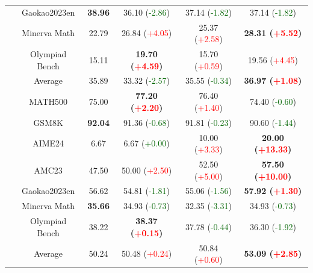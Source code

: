 \begin{table}[t]
\begin{subtable}{\linewidth}
\begin{tabular}{c||c|cccc}
    &  Gaokao2023en & \textbf{38.96} & 36.10 (\textcolor{DarkGreen}{-2.86}) & 37.14 (\textcolor{DarkGreen}{-1.82}) & 37.14 (\textcolor{DarkGreen}{-1.82}) \\
    &  Minerva Math & 22.79 & 26.84 (\textcolor{red}{+4.05}) & 25.37 (\textcolor{red}{+2.58}) & \textbf{28.31 (\textcolor{red}{+5.52})} \\
    &  Olympiad Bench & 15.11 & \textbf{19.70 (\textcolor{red}{+4.59})} & 15.70 (\textcolor{red}{+0.59}) & 19.56 (\textcolor{red}{+4.45}) \\
    & Average & 35.89 & 33.32 (\textcolor{DarkGreen}{-2.57}) & 35.55 (\textcolor{DarkGreen}{-0.34}) & \textbf{36.97 (\textcolor{red}{+1.08})} \\
            \toprule        
             &  MATH500 & 75.00 & \textbf{77.20 (\textcolor{red}{+2.20})} & 76.40 (\textcolor{red}{+1.40}) & 74.40 (\textcolor{DarkGreen}{-0.60}) \\
    &  GSM8K & \textbf{92.04} & 91.36 (\textcolor{DarkGreen}{-0.68}) & 91.81 (\textcolor{DarkGreen}{-0.23}) & 90.60 (\textcolor{DarkGreen}{-1.44}) \\
    &  AIME24 & 6.67 & 6.67 (\textcolor{DarkGreen}{+0.00}) & 10.00 (\textcolor{red}{+3.33}) & \textbf{20.00 (\textcolor{red}{+13.33})} \\
    &  AMC23 & 47.50 & 50.00 (\textcolor{red}{+2.50}) & 52.50 (\textcolor{red}{+5.00}) & \textbf{57.50 (\textcolor{red}{+10.00})} \\
    &  Gaokao2023en & 56.62 & 54.81 (\textcolor{DarkGreen}{-1.81}) & 55.06 (\textcolor{DarkGreen}{-1.56}) & \textbf{57.92 (\textcolor{red}{+1.30})} \\
    &  Minerva Math & \textbf{35.66} & 34.93 (\textcolor{DarkGreen}{-0.73}) & 32.35 (\textcolor{DarkGreen}{-3.31}) & 34.93 (\textcolor{DarkGreen}{-0.73}) \\
    &  Olympiad Bench & 38.22 & \textbf{38.37 (\textcolor{red}{+0.15})} & 37.78 (\textcolor{DarkGreen}{-0.44}) & 36.30 (\textcolor{DarkGreen}{-1.92}) \\
    & Average & 50.24 & 50.48 (\textcolor{red}{+0.24}) & 50.84 (\textcolor{red}{+0.60}) & \textbf{53.09 (\textcolor{red}{+2.85})} \\
            \bottomrule
        \end{tabular}
    \end{subtable}
    

\end{table}
